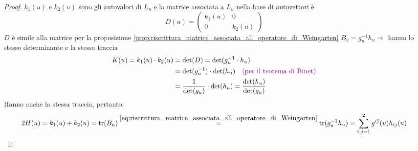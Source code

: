         \begin{proof}
        \mbox{}

        $k_1(u)$ e $k_2(u)$ sono gli autovalori di $L_u$ e la matrice associata a $L_u$ nella base di autovettori è
        \[
        D(u) = \begin{pmatrix} k_1(u) & 0 \\ 0 & k_2(u) \end{pmatrix}
        \]
        $D$ è simile alla matrice per la proposizione \ref{prop:riscrittura_matrice_associata_all_operatore_di_Weingarten} $B_u = g_u^{-1} h_u \Rightarrow$  hanno lo stesso determinante e la stessa traccia
        \begin{align*}
        K(u) = k_1(u) \cdot k_2(u) &= \det(D) = \det(g_u^{-1} \cdot h_u) \\
        &= \det(g_u^{-1}) \cdot \det(h_u) \quad \textcolor{violet}{(\text{per il teorema di Binet})} \\
        &= \frac{1}{\det(g_u)} \cdot \det(h_u) = \frac{\det(h_u)}{\det(g_u)}
        \end{align*}
        Hanno anche la stessa traccia, pertanto:
        \[ 2 H(u) = k_1(u) + k_2(u) = \operatorname{tr}(B_u) \overset{\eqref{eq:riscrittura_matrice_associata_all_operatore_di_Weingarten}}{=} \operatorname{tr}(g_u^{-1} h_u) = \sum_{i,j=1}^2 g^{ij}(u) h_{ij}(u) \]
        \end{proof}
        \newpage

